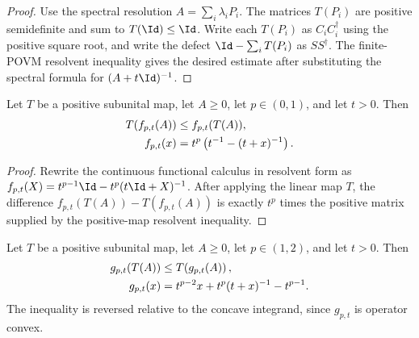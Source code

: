 \begin{proof}
    \leanok
    Use the spectral resolution $A=\sum_i\lambda_iP_i$. The matrices
    $T(P_i)$ are positive semidefinite and sum to $T(\Id)\le\Id$. Write each
    $T(P_i)$ as $C_iC_i^\dagger$ using the positive square root, and write the
    defect $\Id-\sum_iT(P_i)$ as $SS^\dagger$. The finite-POVM resolvent
    inequality gives the desired estimate after substituting the spectral
    formula for $(A+t\Id)^{-1}$.
\end{proof}

\begin{lemma}
    \label{lem:operator_jensen_positive_map_rpow_integrand}
    \leanok
    Let $T$ be a positive subunital map, let $A\ge0$, let
    $p\in(0,1)$, and let $t>0$. Then
    \begin{align}
        T\!\left(f_{p,t}(A)\right)
        &\le f_{p,t}(T(A)), \notag\\
        f_{p,t}(x)
        &=t^p\left(t^{-1}-(t+x)^{-1}\right).
        \notag
    \end{align}
\end{lemma}

\begin{proof}
    \leanok
    Rewrite the continuous functional calculus in resolvent form as
    $f_{p,t}(X)=t^{p-1}\Id-t^p(t\Id+X)^{-1}$.
    After applying the linear map $T$, the difference
    $f_{p,t}(T(A))-T(f_{p,t}(A))$ is exactly $t^p$ times the positive matrix
    supplied by the positive-map resolvent inequality.
\end{proof}

\begin{lemma}
    \label{lem:operator_jensen_positive_map_rpow_integrand_convex}
    \leanok
    Let $T$ be a positive subunital map, let $A\ge0$, let
    $p\in(1,2)$, and let $t>0$. Then
    \begin{align}
        g_{p,t}(T(A))
        &\le T\!\left(g_{p,t}(A)\right), \notag\\
        g_{p,t}(x)
        &=t^{p-2}x+t^p(t+x)^{-1}-t^{p-1}.
        \notag
    \end{align}
    The inequality is reversed relative to the concave integrand, since
    $g_{p,t}$ is operator convex.
\end{lemma}

